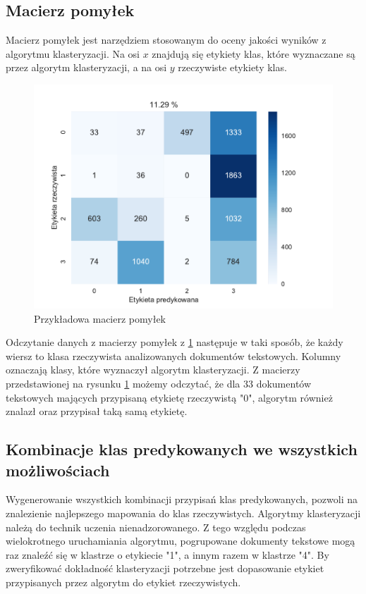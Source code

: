     \subsection{Macierz pomyłek} \label{sec:confusion}
    Macierz pomyłek jest narzędziem stosowanym do oceny jakości wyników z algorytmu klasteryzacji. Na osi $x$ znajdują się etykiety klas, które wyznaczane są przez algorytm klasteryzacji, a na osi $y$ rzeczywiste etykiety klas. 
    \begin{figure}[h!]
        \centering
    \includegraphics[width=0.7\linewidth]{Rysunki/Rozdzial2/confusion.pdf}
    \caption{Przykładowa macierz pomyłek}
    \label{fig:confugsion}
    \end{figure}
    
    Odczytanie danych z macierzy pomyłek z \ref{fig:confugsion} następuje w taki sposób, że każdy wiersz to klasa rzeczywista analizowanych dokumentów tekstowych. Kolumny oznaczają klasy, które wyznaczył algorytm klasteryzacji. 
    Z macierzy przedstawionej na rysunku \ref{fig:confugsion} możemy odczytać, że dla 33 dokumentów tekstowych mających przypisaną etykietę rzeczywistą "0", algorytm również znalazł oraz przypisał taką samą etykietę.
    
    \newpage
    \subsection{Kombinacje klas predykowanych we wszystkich możliwościach} \label{sec:zamianaKlas}
    Wygenerowanie wszystkich kombinacji przypisań klas predykowanych, pozwoli na znalezienie najlepszego mapowania do klas rzeczywistych. Algorytmy klasteryzacji należą do technik uczenia nienadzorowanego. Z tego względu podczas wielokrotnego uruchamiania algorytmu, pogrupowane dokumenty tekstowe mogą raz znaleźć się w klastrze o etykiecie "1", a innym razem w klastrze "4". By zweryfikować dokładność klasteryzacji potrzebne jest dopasowanie etykiet przypisanych przez algorytm do etykiet rzeczywistych. 
    
